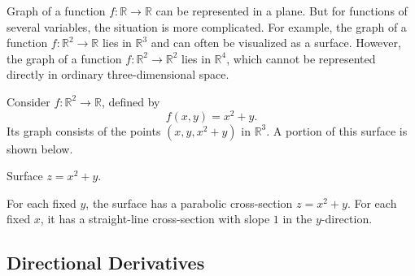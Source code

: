 Graph of a function \( f: \mathbb{R} \to \mathbb{R} \) can be represented in a plane. But for functions of several variables, the situation
is more complicated. For example, the graph of a function $f:\mathbb{R}^2\to\mathbb{R}$ lies in $\mathbb{R}^3$ and can often be visualized as a surface. However, the graph of a function $f:\mathbb{R}^2\to\mathbb{R}^2$ lies in $\mathbb{R}^4$, which cannot be represented directly in ordinary three-dimensional space.

\begin{example}
	Consider \(f:\mathbb{R}^2\to\mathbb{R}\),
	defined by
	\[
		f(x,y)=x^2+y.
	\]
	Its graph consists of the points
	\((x,y,x^2+y)\) in \(\mathbb{R}^3\).
	A portion of this surface is shown below.

	\begin{center}

		\small Surface \(z=x^2+y\).
	\end{center}

	For each fixed \(y\), the surface has a
	parabolic cross-section \(z=x^2+y\).
	For each fixed \(x\), it has a straight-line
	cross-section with slope \(1\) in the
	\(y\)-direction.
\end{example}

\subsection{Directional Derivatives}

